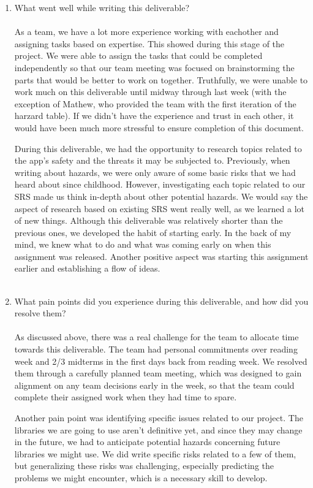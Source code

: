 \documentclass{article}
\begin{document}
\begin{enumerate}
    \item What went well while writing this deliverable?\\\\
    As a team, we have a lot more experience working with eachother and assigning tasks based on expertise. This showed during this stage of the project. We were able to
    assign the tasks that could be completed independently so that our team meeting was focused on brainstorming the parts that would be better to work on together. Truthfully, we 
    were unable to work much on this deliverable until midway through last week (with the exception of Mathew, who provided the team with the first iteration of the harzard table). If we 
    didn't have the experience and trust in each other, it would have been much more stressful to ensure completion of this document.
    
    During this deliverable, we had the opportunity to research topics related to the app’s safety and the threats it may be subjected to. Previously, when writing about hazards, 
    we were only aware of some basic risks that we had heard about since childhood. However, investigating each topic related to our SRS made us think in-depth about other potential hazards. 
    We would say the aspect of research based on existing SRS went really well, as we learned a lot of new things. Although this deliverable was relatively shorter than the previous ones, we developed the habit of starting early. In the back of my mind, we knew what to 
    do and what was coming early on when this assignment was released. Another positive aspect was starting this assignment earlier and establishing a flow of ideas.
    \\\\
    \item What pain points did you experience during this deliverable, and how
    did you resolve them?\\\\
    As discussed above, there was a real challenge for the team to allocate time towards this deliverable. The team had personal commitments over reading week
    and 2/3 midterms in the first days back from reading week. We resolved them through a carefully planned team meeting, which was designed to gain alignment on any team decisions
    early in the week, so that the team could complete their assigned work when they had time to spare.

    Another pain point was identifying specific issues related to our project. The libraries we are going to use aren’t definitive yet, and since they may change in the future, 
    we had to anticipate potential hazards concerning future libraries we might use. We did write specific risks related to a few of them, 
    but generalizing these risks was challenging, especially predicting the problems we might encounter, which is a necessary skill to develop.
    

\end{enumerate}
\end{document}
